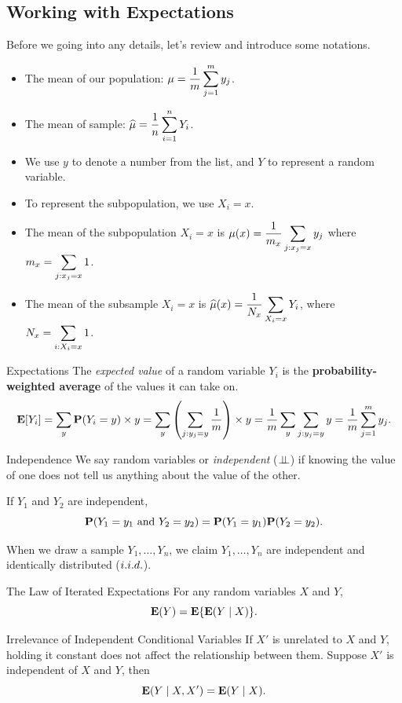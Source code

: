 \subsection{Working with Expectations}
Before we going into any details, let's review and introduce some notations.
\begin{nota}
	\begin{itemize}
		\item The mean of our population: $\dsst\mu=\dfrac{1}{m}\sum_{j=1}^my_j$.
		\item The mean of sample: $\hat\mu=\dfrac{1}{n}\dsst\sum_{i=1}^nY_i$.
		\item We use $y$ to denote a number from the list, and $Y$ to represent a random variable. 
		\item To represent the subpopulation, we use $X_i=x$. 
		\item The mean of the subpopulation $X_i=x$ is $\mu(x)=\dfrac{1}{m_x}\dsst\sum_{j:x_j=x}y_j$ where $m_x=\dsst\sum_{j:x_j=x}1$.
		\item The mean of the subsample $X_i=x$ is $\hat\mu(x)=\dfrac{1}{N_x}\dsst\sum_{X_i=x}Y_i$, where $N_x=\dsst\sum_{i:X_i=x}1$.
	\end{itemize}
\end{nota}
\begin{df}{Expectations}
	The \textit{expected value} of a random variable $Y_i$ is the \textbf{probability-weighted average} of the values it can take on. \[\E\qty[Y_i]=\sum_y\P\qty(Y_i=y)\times y=\sum_y\qty(\sum_{j:y_j=y}\dfrac{1}{m})\times y=\dfrac{1}{m}\sum_y\sum_{j:y_j=y}y=\dfrac{1}{m}\sum_{j=1}^my_j.\]
\end{df}
\begin{df}{Independence}
	We say random variables or \textit{independent} ($\independ$) if knowing the value of one does not tell us anything about the value of the other. 	
\end{df}
\begin{cor}{}
	If $Y_1$ and $Y_2$ are independent, \[\P(Y_1=y_1\text{ and }Y_2=y_2)=\P(Y_1=y_1)\P(Y_2=y_2).\]
\end{cor}
\begin{rmk}
	When we draw a sample $Y_1,\dots,Y_n$, we claim $Y_1,\dots,Y_n$ are independent and identically distributed ($\iid$).	
\end{rmk}
\begin{thm}{The Law of Iterated Expectations}
	For any random variables $X$ and $Y$, \[\E(Y)=\E\qty{\E(Y\mid X)}.\]
\end{thm}
\begin{thm}{Irrelevance of Independent Conditional Variables}
	If $X'$ is unrelated to $X$ and $Y$, holding it constant does not affect the relationship between them. Suppose $X'$ is independent of $X$ and $Y$, then \[\E(Y\mid X,X')=\E(Y\mid X).\]	
\end{thm}
